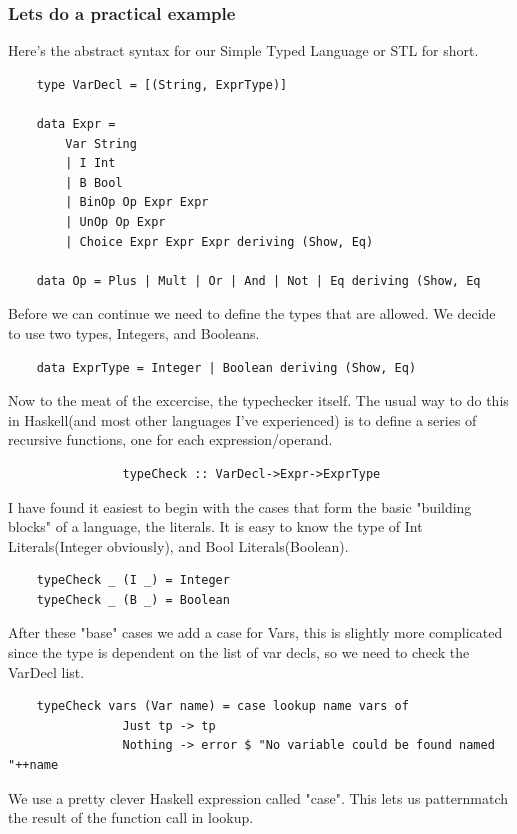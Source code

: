 \documentclass{article}
\begin{document}
            \subsubsection*{Lets do a practical example}
            Here's the abstract syntax for our Simple Typed Language or STL for short.
            \begin{lstlisting}
    type VarDecl = [(String, ExprType)]

    data Expr =
        Var String
        | I Int
        | B Bool
        | BinOp Op Expr Expr
        | UnOp Op Expr
        | Choice Expr Expr Expr deriving (Show, Eq)
                
    data Op = Plus | Mult | Or | And | Not | Eq deriving (Show, Eq
            \end{lstlisting}
            Before we can continue we need to define the types that are allowed. We decide to use two types, Integers, and Booleans.
            \begin{lstlisting}
    data ExprType = Integer | Boolean deriving (Show, Eq)
            \end{lstlisting}
            Now to the meat of the excercise, the typechecker itself.
            The usual way to do this in Haskell(and most other languages I've experienced) is to define a series of recursive functions, one for each
            expression/operand.
            \begin{lstlisting}
                typeCheck :: VarDecl->Expr->ExprType
            \end{lstlisting}
            I have found it easiest to begin with the cases that form the basic "building blocks" of a language, the literals. It is easy to know the type of Int Literals(Integer obviously), and Bool Literals(Boolean).
            \begin{lstlisting}
    typeCheck _ (I _) = Integer
    typeCheck _ (B _) = Boolean
            \end{lstlisting} 
            After these "base" cases we add a case for Vars, this is slightly more complicated since the type is dependent on the list of var decls, 
            so we need to check the VarDecl list.
            \begin{lstlisting}
    typeCheck vars (Var name) = case lookup name vars of
                Just tp -> tp
                Nothing -> error $ "No variable could be found named "++name
            \end{lstlisting}
            We use a pretty clever Haskell expression called "case". This lets us patternmatch the result of the function call in lookup. 
\end{document}
